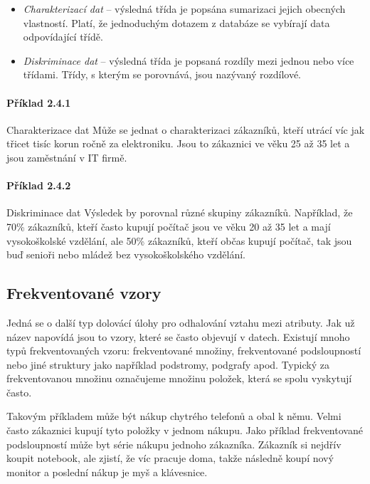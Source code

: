 \begin{itemize}
    \item \textit{Charakterizací dat} -- výsledná třída je popsána sumarizaci jejich obecných vlastností. Platí, že jednoduchým dotazem z databáze se vybírají data odpovídající třídě.
    \item \textit{Diskriminace dat} -- výsledná třída je popsaná rozdíly mezi jednou nebo více třídami. Třídy, s kterým se porovnává, jsou nazývaný rozdílové.
\end{itemize}

\paragraph{Příklad 2.4.1} Charakterizace dat \newline
Může se jednat o charakterizaci zákazníků, kteří utrácí víc jak třicet tisíc korun ročně za elektroniku. Jsou to zákaznici ve věku 25 až 35 let a jsou zaměstnání v IT firmě. 

\paragraph{Příklad 2.4.2} Diskriminace dat \newline
Výsledek by porovnal různé skupiny zákazníků. Například, že 70\% zákazníků, kteří často kupují počítač jsou ve věku 20 až 35 let a mají vysokoškolské vzdělání, ale 50\% zákazníků, kteří občas kupují počítač, tak jsou buď senioři nebo mládež bez vysokoškolského vzdělání.

\subsection*{Frekventované vzory}
Jedná se o další typ dolovácí úlohy pro odhalování vztahu mezi atributy. Jak už název napovídá jsou to vzory, které se často objevují v datech. Existují mnoho typů frekventovaných vzoru: frekventované množiny, frekventované podsloupností nebo jiné struktury jako například podstromy, podgrafy apod. Typický za frekventovanou množinu označujeme množinu položek, která se spolu vyskytují často. \cite{Han}

Takovým příkladem může být nákup chytrého telefonů a obal k němu. Velmi často zákaznici kupují tyto položky v jednom nákupu. Jako příklad frekventované podsloupností může byt  série nákupu jednoho zákazníka. Zákazník si nejdřív koupit notebook, ale zjistí, že víc pracuje doma, takže následně koupí nový monitor a poslední nákup je myš a klávesnice.

